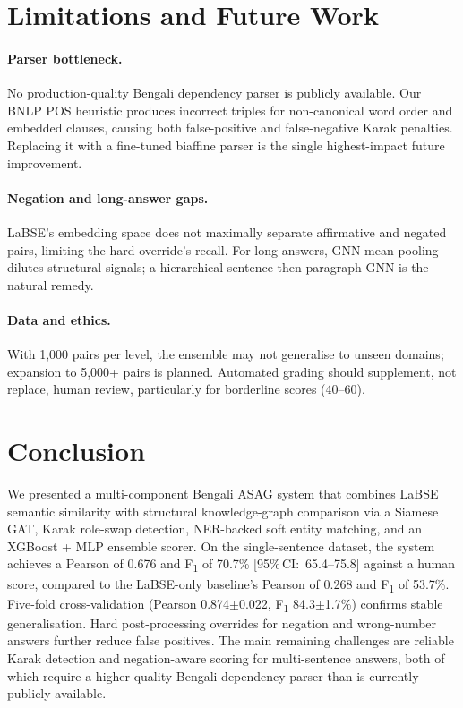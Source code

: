 \documentclass[11pt]{article}
\begin{document}
\section{Limitations and Future Work}

\paragraph{Parser bottleneck.} No production-quality Bengali dependency parser is publicly available. Our BNLP POS heuristic produces incorrect triples for non-canonical word order and embedded clauses, causing both false-positive and false-negative Karak penalties. Replacing it with a fine-tuned biaffine parser is the single highest-impact future improvement.

\paragraph{Negation and long-answer gaps.} LaBSE's embedding space does not maximally separate affirmative and negated pairs, limiting the hard override's recall. For long answers, GNN mean-pooling dilutes structural signals; a hierarchical sentence-then-paragraph GNN is the natural remedy.

\paragraph{Data and ethics.} With 1{,}000 pairs per level, the ensemble may not generalise to unseen domains; expansion to 5{,}000+ pairs is planned. Automated grading should supplement, not replace, human review, particularly for borderline scores (40--60).

\section{Conclusion}

We presented a multi-component Bengali ASAG system that combines LaBSE semantic similarity with structural knowledge-graph comparison via a Siamese GAT, Karak role-swap detection, NER-backed soft entity matching, and an XGBoost + MLP ensemble scorer. On the single-sentence dataset, the system achieves a Pearson of 0.676 and F\textsubscript{1} of 70.7\% \mbox{[95\%\,CI: 65.4--75.8]} against a human score, compared to the LaBSE-only baseline's Pearson of 0.268 and F\textsubscript{1} of 53.7\%. Five-fold cross-validation (Pearson 0.874$\pm$0.022, F\textsubscript{1} 84.3$\pm$1.7\%) confirms stable generalisation. Hard post-processing overrides for negation and wrong-number answers further reduce false positives. The main remaining challenges are reliable Karak detection and negation-aware scoring for multi-sentence answers, both of which require a higher-quality Bengali dependency parser than is currently publicly available.
\end{document}
